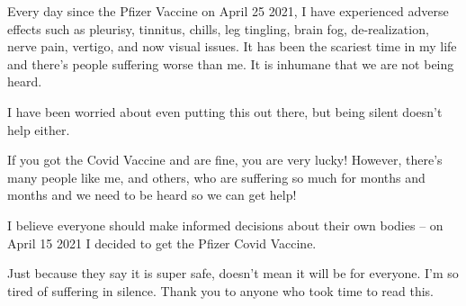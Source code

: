 Every day since the Pfizer Vaccine on April 25 2021, I have experienced adverse
effects such as pleurisy, tinnitus, chills, leg tingling, brain fog,
de-realization, nerve pain, vertigo, and now visual issues. It has been the
scariest time in my life and there’s people suffering worse than me. It is
inhumane that we are not being heard.

I have been worried about even putting this out there, but being silent doesn’t
help either.

If you got the Covid Vaccine and are fine, you are very lucky! However, there’s
many people like me, and others, who are suffering so much for months and months
and we need to be heard so we can get help!

I believe everyone should make informed decisions about their own bodies – on
April 15 2021 I decided to get the Pfizer Covid Vaccine.

Just because they say it is super safe, doesn’t mean it will be for
everyone. I’m so tired of suffering in silence. Thank you to anyone who took
time to read this.
